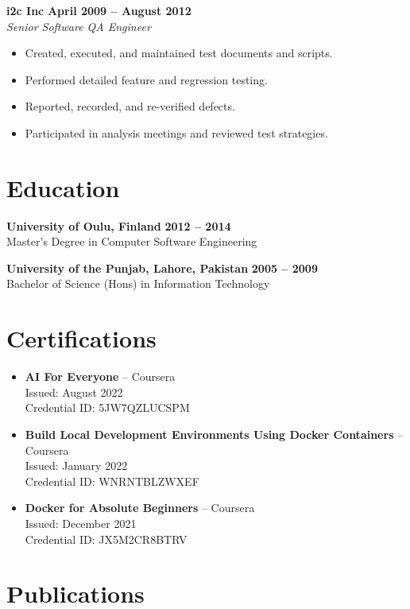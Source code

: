 \documentclass[12pt]{article}
\begin{document}
\textbf{i2c Inc} \hfill \textbf{April 2009 – August 2012} \\
\textit{Senior Software QA Engineer} \\
\begin{itemize}
    \item Created, executed, and maintained test documents and scripts.
    \item Performed detailed feature and regression testing.
    \item Reported, recorded, and re-verified defects.
    \item Participated in analysis meetings and reviewed test strategies.
\end{itemize}

\section*{Education}

\textbf{University of Oulu, Finland} \hfill \textbf{2012 – 2014} \\
Master's Degree in Computer Software Engineering

\textbf{University of the Punjab, Lahore, Pakistan} \hfill \textbf{2005 – 2009} \\
Bachelor of Science (Hons) in Information Technology

\section*{Certifications}

\begin{itemize}[leftmargin=1.5em]
    \item \textbf{AI For Everyone} -- Coursera \\
    Issued: August 2022 \\
    Credential ID: 5JW7QZLUCSPM
    \item \textbf{Build Local Development Environments Using Docker Containers} -- Coursera \\
    Issued: January 2022 \\
    Credential ID: WNRNTBLZWXEF
    \item \textbf{Docker for Absolute Beginners} -- Coursera \\
    Issued: December 2021 \\
    Credential ID: JX5M2CR8BTRV
\end{itemize}

\section*{Publications}
\end{document}
